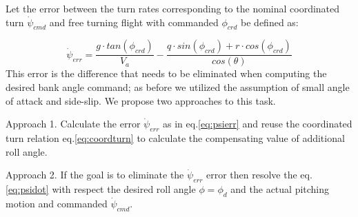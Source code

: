 \documentclass[]{article}
\begin{document}
Let the error between the turn rates corresponding to the nominal coordinated turn $\dot{\psi}_{cmd}$ and free turning flight with commanded $\phi_{crd}$ be defined as:

\begin{equation}
\label{eq:psierr}
	\dot{\psi}_{err}=\frac { g \cdot tan(\phi_{crd})} {V_a} - \frac {q \cdot sin(\phi_{crd})+ r \cdot cos(\phi_{crd})} {cos(\theta)}	
\end{equation}
This error is the difference that needs to be eliminated when computing the desired bank angle command; as before we utilized the assumption of small angle of attack and side-slip. We propose two approaches to this task. 

Approach 1. Calculate the error $\dot{\psi}_{err}$ as in eq.\ref{eq:psierr} and reuse the coordinated turn relation eq.\ref{eq:coordturn} to calculate the compensating value of additional roll angle.

Approach 2. If the goal is to eliminate the $\dot{\psi}_{err}$ error then resolve the eq.\ref{eq:psidot} with respect the desired roll angle $\phi=\phi_d$ and the actual pitching motion and commanded $\dot{\psi}_{cmd}$.
\end{document}
